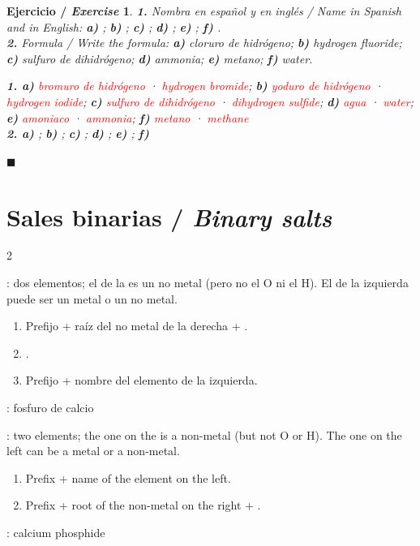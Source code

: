 \documentclass[12pt]{article}
\theoremstyle{mygreennumbox}
\newtheorem{ejercicioT}{Ejercicio / \textit{Exercise}}[section]
\newenvironment{exercise}{\begin{eBoxmygreen}\begin{ejercicioT}}{\hfill{\color{mygreen}\tiny\ensuremath{\blacksquare}}\end{ejercicioT}\end{eBoxmygreen}}
\newcommand{\en}[1]{\textit{#1}}
\newcommand{\cabcol}[1]{\raggedright\noindent{\sffamily\bfseries\color{myOrange3}#1}\par\smallskip}
\newenvironment{reglas}{%
    \par\medskip\setlength{\columnseprule}{0.4pt}%
    \begin{paracol}{2}\cabcol{Español}%
}{%
    \end{paracol}\medskip%
}
\newcommand{\ingles}{\switchcolumn\cabcol{English}}
\begin{document}
\begin{exercise}
    \textbf{1.} Nombra en español y en inglés / \en{Name in Spanish and in English}: \textbf{a)} ; \textbf{b)} ; \textbf{c)} ; \textbf{d)} ; \textbf{e)} ; \textbf{f)} .\\
    \textbf{2.} Formula / \en{Write the formula}: \textbf{a)} cloruro de hidrógeno; \textbf{b)} \en{hydrogen fluoride}; \textbf{c)} sulfuro de dihidrógeno; \textbf{d)} \en{ammonia}; \textbf{e)} metano; \textbf{f)} \en{water}.
    \begin{solu}
        \textbf{1. a)} \textcolor{red}{bromuro de hidrógeno} · \textcolor{red}{\en{hydrogen bromide}}; \textbf{b)} \textcolor{red}{yoduro de hidrógeno} · \textcolor{red}{\en{hydrogen iodide}}; \textbf{c)} \textcolor{red}{sulfuro de dihidrógeno} · \textcolor{red}{\en{dihydrogen sulfide}}; \textbf{d)} \textcolor{red}{agua} · \textcolor{red}{\en{water}}; \textbf{e)} \textcolor{red}{amoniaco} · \textcolor{red}{\en{ammonia}}; \textbf{f)} \textcolor{red}{metano} · \textcolor{red}{\en{methane}}\\
        \textbf{2. a)} \textcolor{red}{}; \textbf{b)} \textcolor{red}{}; \textbf{c)} \textcolor{red}{}; \textbf{d)} \textcolor{red}{}; \textbf{e)} \textcolor{red}{}; \textbf{f)} \textcolor{red}{}
    \end{solu}
\end{exercise}

\section{Sales binarias / \en{Binary salts}}

\begin{reglas}
    : dos elementos; el de la  es un no metal (pero no el O ni el H). El de la izquierda puede ser un metal o un no metal.
    \begin{enumerate}[label=\numberballgreen]
        \item Prefijo + raíz del no metal de la derecha + .
        \item {}.
        \item Prefijo + nombre del elemento de la izquierda.
    \end{enumerate}
    : fosfuro de calcio
    \ingles
    : two elements; the one on the  is a non-metal (but not O or H). The one on the left can be a metal or a non-metal.
    \begin{enumerate}[label=\numberballgreen]
        \item Prefix + name of the element on the left.
        \item Prefix + root of the non-metal on the right + .
    \end{enumerate}
    : calcium phosphide
\end{reglas}
\end{document}
